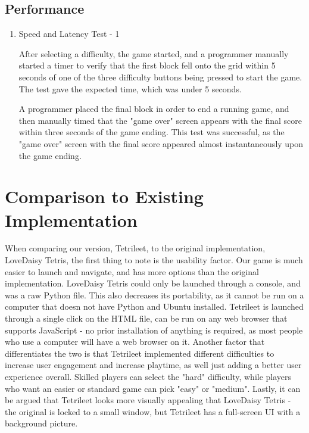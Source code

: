 \documentclass[12pt, titlepage]{article}
\begin{document}
\subsection{Performance}

\begin{enumerate}

\item{Speed and Latency Test - 1\\}

After selecting a difficulty, the game started, and a programmer manually started a timer to verify that the first block fell onto the grid within 5 seconds of one of the three difficulty buttons being pressed to start the game. The test gave the expected time, which was under 5 seconds.


A programmer placed the final block in order to end a running game, and then manually timed that the "game over" screen appears with the final score within three seconds of the game ending. This test was successful, as the "game over" screen with the final score appeared almost instantaneously upon the game ending.

\end{enumerate}
\section{Comparison to Existing Implementation}	
When comparing our version, Tetrileet, to the original implementation, LoveDaisy Tetris, the first thing to note is the usability factor. Our game is much easier to launch and navigate, and has more options than the original implementation. LoveDaisy Tetris could only be launched through a console, and was a raw Python file. This also decreases its portability, as it cannot be run on a computer that doesn not have Python and Ubuntu installed. Tetrileet is launched through a single click on the HTML file, can be run on any web browser that supports JavaScript - no prior installation of anything is required, as most people who use a computer will have a web browser on it. Another factor that differentiates the two is that Tetrileet implemented different difficulties to increase user engagement and increase playtime, as well just adding a better user experience overall. Skilled players can select the "hard" difficulty, while players who want an easier or standard game can pick "easy" or "medium". Lastly, it can be argued that Tetrileet looks more visually appealing that LoveDaisy Tetris - the original is locked to a small window, but Tetrileet has a full-screen UI with a background picture.
\end{document}
